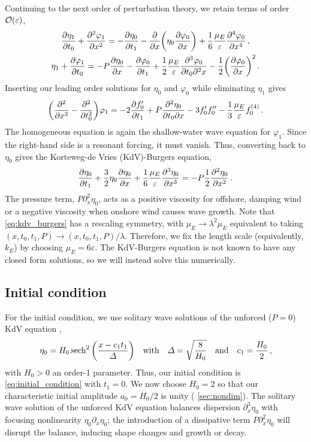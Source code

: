 \documentclass{jfm}
\renewcommand*{\epsilon}{\varepsilon}
\begin{document}
Continuing to the next order of perturbation theory, we retain terms of
order $\order{\epsilon}$,
\begin{gather}
    \pdv{\eta_1}{t_0} + \pdv[2]{\varphi_{1}}{x} =
      -\pdv{\eta_0}{t_1} - \pdv{x} \pqty{\eta_0 \pdv{\varphi_0}{x}} +
      \frac{1}{6} \frac{\mu_E}{\epsilon} \pdv[4]{\varphi_0}{x} \,,
  \\
    \eta_1 + \pdv{\varphi_1}{t_0} = -P \pdv{\eta_0}{x} -\pdv{\varphi_0}{t_1}
      + \frac{1}{2} \frac{\mu_E}{\epsilon} \frac{\partial^3 \varphi_0}
        {\partial t_0 \partial^2 x}
      - \frac{1}{2} \pqty{ \pdv{\varphi_0}{x} }^2
  \,.
\end{gather}
Inserting our leading order solutions for $\eta_0$ and $\varphi_0$ while
eliminating $\eta_1$ gives
\begin{equation}
  \pqty{\pdv[2]{x} - \pdv[2]{t_0}} \varphi_1 = -2 \pdv{f_0'}{t_1} +
    P\pdv{\eta_0}{t_0}{x} - 3 f_0' f_0'' - \frac{1}{3} \frac{\mu_E}{\epsilon}
    f_0^{(4)} \,.
\end{equation}
The homogeneous equation is again the shallow-water wave equation for
$\varphi_1$.
Since the right-hand side is a resonant forcing, it must vanish.
Thus, converting back to $\eta_0$ gives the Korteweg-de Vries
(KdV)-Burgers equation,
\begin{equation}
  \pdv{\eta_0}{t_1} + \frac{3}{2}
    \eta_0 \pdv{\eta_0}{x} + \frac{1}{6} \frac{\mu_E}{\epsilon}
    \pdv[3]{\eta_0}{x} = -P \frac{1}{2} \pdv[2]{\eta_0}{x} \,.
  \label{eq:kdv_burgers}
\end{equation}
The pressure term, $P \partial^2_x \eta_0$, acts as a positive viscosity
for offshore, damping wind or a negative viscosity when onshore wind
causes wave growth.
Note that \cref{eq:kdv_burgers} has a rescaling symmetry, with $\mu_E
\to \lambda^2 \mu_E$ equivalent to taking $(x,t_0,t_1,P) \to
(x,t_0,t_1,P)/\lambda$.
Therefore, we fix the length scale (equivalently, $k_E$) by choosing
$\mu_E = 6 \epsilon$.
The KdV-Burgers equation is not known to have any closed form solutions,
so we will instead solve this numerically.

\subsection{\label{sec:initial} Initial condition}
For the initial condition, we use solitary wave solutions of the unforced
($P=0$) KdV equation \citep[\eg][]{mei2005nonlinear},
\begin{equation}
  \eta_0 = H_0 \sech^2\pqty{\frac{x - c_1 t_1}{\Delta}}
  \qq{with}
  \Delta = \sqrt{\frac{8}{H_0}}
  \qq{and}
  c_1 = \frac{H_0}{2} \,,
  \label{eq:initial_condition}
\end{equation}
with $H_0>0$ an order-1 parameter.
Thus, our initial condition is \cref{eq:initial_condition} with $t_1=0$.
We now choose $H_0 = 2$ so that our characteristic initial amplitude
$a_0 = H_0/2$ is unity (\cf{} \cref{sec:nondim}).
The solitary wave solution of the unforced KdV equation balances
dispersion $\partial_x^3 \eta_0$ with focusing nonlinearity $\eta_0
\partial_x \eta_0$; the introduction of a dissipative term $P
\partial_x^2 \eta_0$ will disrupt the balance, inducing shape changes
and growth or decay.
\end{document}
